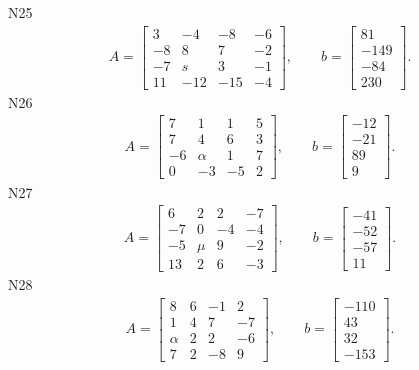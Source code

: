 \documentclass[11pt]{report}
\begin{document}
N25
\begin{align*}
 A = \left[\begin{matrix}3 & -4 & -8 & -6\\-8 & 8 & 7 & -2\\-7 & s & 3 & -1\\11 & -12 & -15 & -4\end{matrix}\right],
\qquad b = \left[\begin{matrix}81\\-149\\-84\\230\end{matrix}\right]. 
 \end{align*}
N26
\begin{align*}
 A = \left[\begin{matrix}7 & 1 & 1 & 5\\7 & 4 & 6 & 3\\-6 & \alpha & 1 & 7\\0 & -3 & -5 & 2\end{matrix}\right],
\qquad b = \left[\begin{matrix}-12\\-21\\89\\9\end{matrix}\right]. 
 \end{align*}
N27
\begin{align*}
 A = \left[\begin{matrix}6 & 2 & 2 & -7\\-7 & 0 & -4 & -4\\-5 & \mu & 9 & -2\\13 & 2 & 6 & -3\end{matrix}\right],
\qquad b = \left[\begin{matrix}-41\\-52\\-57\\11\end{matrix}\right]. 
 \end{align*}
N28
\begin{align*}
 A = \left[\begin{matrix}8 & 6 & -1 & 2\\1 & 4 & 7 & -7\\\alpha & 2 & 2 & -6\\7 & 2 & -8 & 9\end{matrix}\right],
\qquad b = \left[\begin{matrix}-110\\43\\32\\-153\end{matrix}\right]. 
 \end{align*}
\end{document}
